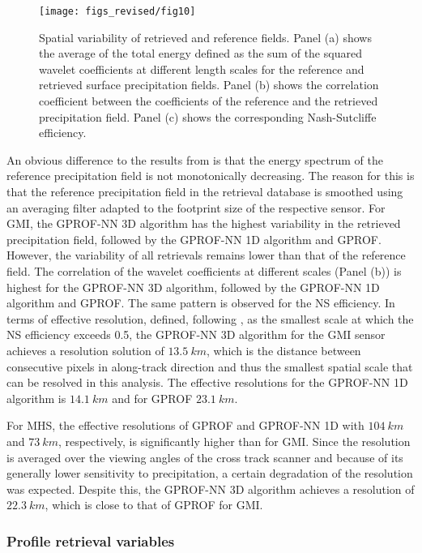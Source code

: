 \documentclass[journal abbreviation, manuscript]{copernicus}
\begin{document}
\begin{figure}[hbpt!]
  \centering \texttt{[image: figs\_revised/fig10]}
  \caption{ Spatial variability of retrieved and reference fields. Panel (a)
    shows the average of the total energy defined as the sum of the squared
    wavelet coefficients at different length scales for the reference and
    retrieved surface precipitation fields. Panel (b) shows the correlation
    coefficient between the coefficients of the reference and the retrieved
    precipitation field. Panel (c) shows the corresponding Nash-Sutcliffe
    efficiency.}
  \label{fig:resolution}
\end{figure}

An obvious difference to the results from \citet{guilloteau17} is that the
energy spectrum of the reference precipitation field is not monotonically
decreasing. The reason for this is that the reference precipitation field in the
retrieval database is smoothed using an averaging filter adapted to the
footprint size of the respective sensor. For GMI, the GPROF-NN 3D algorithm has
the highest variability in the retrieved precipitation field, followed by the
GPROF-NN 1D algorithm and GPROF. However, the variability of all retrievals
remains lower than that of the reference field. The correlation of the wavelet
coefficients at different scales (Panel (b)) is highest for the GPROF-NN 3D
algorithm, followed by the GPROF-NN 1D algorithm and GPROF. The same pattern is
observed for the NS efficiency. In terms of effective resolution, defined,
following \citet{guilloteau17}, as the smallest scale at which the NS efficiency
exceeds 0.5, the GPROF-NN 3D algorithm for the GMI sensor achieves a resolution
solution of $13.5\ \unit{km}$, which is the distance between consecutive pixels
in along-track direction and thus the smallest spatial scale that can be
resolved in this analysis. The effective resolutions for the GPROF-NN 1D
algorithm is $14.1\ \unit{km}$ and for GPROF $23.1\ \unit{km}$.

For MHS, the effective resolutions of GPROF and GPROF-NN 1D with
$104\ \unit{km}$ and $73\ \unit{km}$, respectively, is significantly higher than
for GMI. Since the resolution is averaged over the viewing angles of the cross
track scanner and because of its generally lower sensitivity to precipitation, a
certain degradation of the resolution was expected. Despite this, the GPROF-NN
3D algorithm achieves a resolution of $22.3\ \unit{km}$, which is close to that
of GPROF for GMI.

\subsubsection{Profile retrieval variables}
\end{document}

